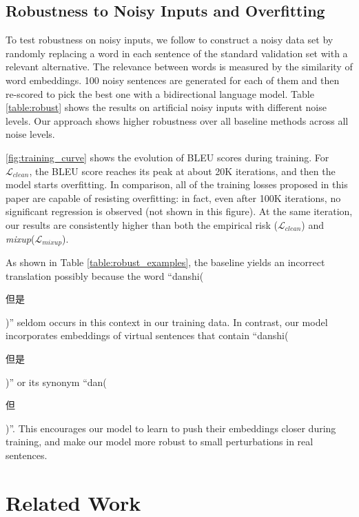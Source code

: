 \documentclass[11pt,a4paper]{article}
\newcommand{\mixup}{\textit{mixup}\xspace}
\begin{document}
\subsection{Robustness to Noisy Inputs and Overfitting}
To test robustness on noisy inputs, we follow \citet{Cheng:19} to construct a noisy data set by randomly replacing a word in each sentence of the standard validation set with a relevant alternative. The relevance between words is measured by the similarity of word embeddings. 100 noisy sentences are generated for each of them and then re-scored to pick the best one with a bidirectional language model. Table \ref{table:robust} shows the results on artificial noisy inputs with different noise levels. Our approach shows higher robustness over all baseline methods across all noise levels.

\autoref{fig:training_curve} shows the evolution of BLEU scores during training. For $\mathcal{L}_{clean}$, the BLEU score reaches its peak at about 20K iterations, and then the model starts overfitting. In comparison, all of the training losses proposed in this paper are capable of resisting overfitting: in fact, even after 100K iterations, no significant regression is observed (not shown in this figure).
At the same iteration, our results are consistently higher than both the empirical risk ($\mathcal{L}_{clean}$) and \mixup ($\mathcal{L}_{mixup}$).

As shown in Table \ref{table:robust_examples}, the baseline yields an incorrect translation possibly because the word “danshi(\begin{CJK*}{UTF8}{gbsn}{但是}\end{CJK*})” seldom occurs in this context in our training data. In contrast, our model incorporates embeddings of virtual sentences that contain “danshi(\begin{CJK*}{UTF8}{gbsn}{但是}\end{CJK*})” or its synonym “dan(\begin{CJK*}{UTF8}{gbsn}{但}\end{CJK*})”. This encourages our model to learn to push their embeddings closer during training, and make our model more robust to small perturbations in real sentences.

\section{Related Work}
\end{document}
